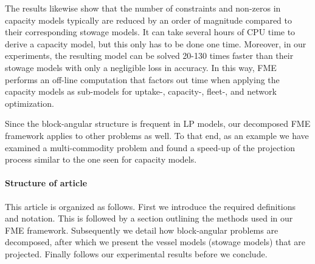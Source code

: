 The results likewise show that the number of constraints and non-zeros in capacity models typically are reduced by an order of magnitude compared to their corresponding stowage models. 
It can take several hours of CPU time to derive a capacity model, but this only has to be done one time. Moreover, in our experiments, the resulting model can be solved 20-130 times faster than their stowage models with only a negligible loss in accuracy. In this way, FME performs an off-line computation that factors out time when applying the capacity models as sub-models for uptake-, capacity-, fleet-, and network optimization.

Since the block-angular structure is frequent in LP models, our decomposed FME framework applies to other problems as well. To that end, as an example we have examined a multi-commodity problem and found a speed-up of the projection process similar to the one seen for capacity models.

\paragraph{Structure of article}
This article is organized as follows. First we introduce the required definitions and notation. This is followed by a section outlining the methods used in our FME framework. Subsequently we detail how block-angular problems are decomposed, after which we present the vessel models (stowage models) that are projected. Finally follows our experimental results before we conclude.

{}



